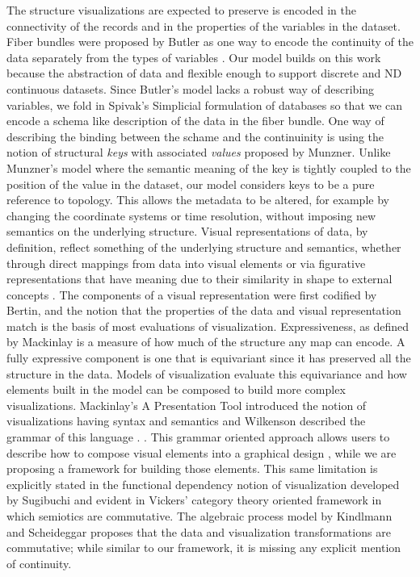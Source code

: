 \documentclass[journal]{vgtc}                %
\begin{document}
The structure visualizations are expected to preserve is encoded in the connectivity of the records and in the properties of the variables in the dataset. Fiber bundles were proposed by Butler as one way to encode the continuity of the data separately from the types of variables \cite{butlerVisualizationModelBased1989,butlerVectorBundleClassesForm1992}. Our model builds on this work because the abstraction of data and flexible enough to support discrete and ND continuous datasets. Since Butler's model lacks a robust way of describing variables, we fold in Spivak's Simplicial formulation of databases \cite{spivakDatabasesAreCategories2010,spivakSIMPLICIALDATABASES} so that we can encode a schema like description of the data in the fiber bundle. One way of describing the binding between the schame and the continuinity is using the notion of structural \textit{keys} with associated \textit{values} proposed by Munzner\cite{munznerVisualizationAnalysisDesign2014}. Unlike Munzner's model where the semantic meaning of the key is tightly coupled to the position of the value in the dataset, our model considers keys to be a pure reference to topology. This allows the metadata to be altered, for example by changing the coordinate systems or time resolution, without imposing new semantics on the underlying structure.
Visual representations of data, by definition, reflect something of the underlying structure and semantics\cite{friendlyBriefHistoryData2008}, whether through direct mappings from data into visual elements or via figurative representations that have meaning due to their similarity in shape to external concepts \cite{byrneAcquiredCodesMeaning2016}. The components of a visual representation were first codified by Bertin\cite{bertinSemiologyGraphicsDiagrams2011a}, and the notion that the properties of the data and visual representation match is the basis of most evaluations of visualization. Expressiveness, as defined by Mackinlay \cite{mackinlayAUTOMATICDESIGNGRAPHICAL1987, mackinlayAutomatingDesignGraphical1986} is a measure of how much of the structure any map can encode. A fully expressive component is one that is equivariant since it has preserved all the structure in the data. 
Models of visualization evaluate this equivariance and how elements built in the model can be composed to build more complex visualizations. Mackinlay's A Presentation Tool introduced the notion of visualizations having syntax and semantics \cite{mackinlayAutomatingDesignGraphical1986} and Wilkenson described the grammar of this language \cite{wilkinsonGrammarGraphics2005}. . This grammar oriented approach allows users to describe how to compose visual elements into a graphical design \cite{wongsuphasawatNavigatingWideWorld2021}, while we are proposing a framework for building those elements. This same limitation is explicitly stated in the functional dependency notion of visualization developed by Sugibuchi\cite{sugibuchiFramwork2009} and evident in Vickers' category theory oriented framework in which semiotics are commutative. The algebraic process model by Kindlmann and Scheideggar proposes that the data and visualization transformations are commutative; while similar to our framework, it is missing any explicit mention of continuity. 
\end{document}
